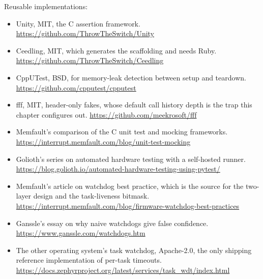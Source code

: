 Reusable implementations:
\begin{itemize}
\item Unity, MIT, the C assertion framework.\newline
\url{https://github.com/ThrowTheSwitch/Unity}
\item Ceedling, MIT, which generates the scaffolding and needs Ruby.\newline
\url{https://github.com/ThrowTheSwitch/Ceedling}
\item CppUTest, BSD, for memory-leak detection between setup and teardown.\newline
\url{https://github.com/cpputest/cpputest}
\item fff, MIT, header-only fakes, whose default call history depth is the trap
this chapter configures out.\newline
\url{https://github.com/meekrosoft/fff}
\item Memfault's comparison of the C unit test and mocking frameworks.\newline
\url{https://interrupt.memfault.com/blog/unit-test-mocking}
\item Golioth's series on automated hardware testing with a self-hosted
runner.\newline
\url{https://blog.golioth.io/automated-hardware-testing-using-pytest/}
\item Memfault's article on watchdog best practice, which is the source for the
two-layer design and the task-liveness bitmask.\newline
\url{https://interrupt.memfault.com/blog/firmware-watchdog-best-practices}
\item Ganssle's essay on why naive watchdogs give false confidence.\newline
\url{https://www.ganssle.com/watchdogs.htm}
\item The other operating system's task watchdog, Apache-2.0, the only shipping
reference implementation of per-task timeouts.\newline
\url{https://docs.zephyrproject.org/latest/services/task_wdt/index.html}
\end{itemize}
